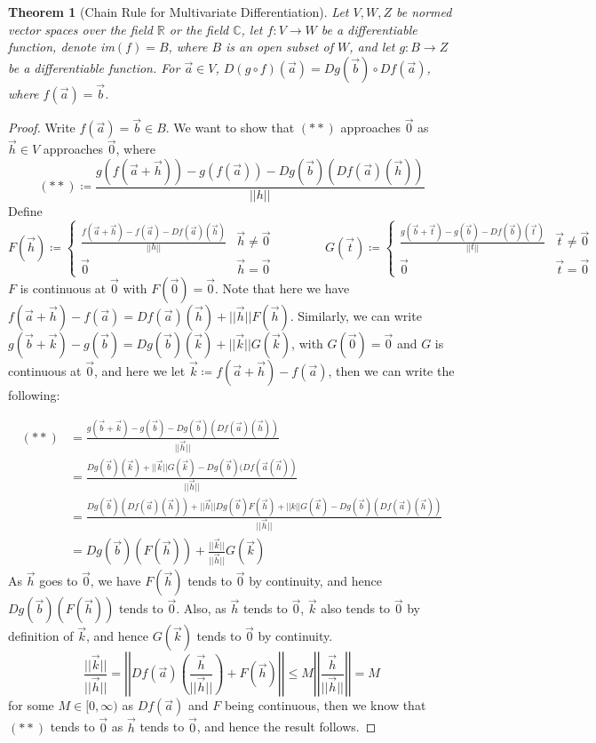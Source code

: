 \documentclass[11pt,oneside]{book}
\theoremstyle{break}
\theoremstyle{break}
\newtheorem{thm}{Theorem}[section]
\newcommand{\R}{\mathbb{R}}
\newcommand{\Complex}{\mathbb{C}}
\begin{document}
\newpage

\begin{thm}[Chain Rule for Multivariate Differentiation]
Let $V,W,Z$ be normed vector spaces over the field $\R$ or the field $\Complex$, let $f:V \to W$ be a differentiable function, denote im$(f) = B$, where $B$ is an open subset of $W$, and let $g:B \to Z$ be a differentiable function. For $\vec{a}\in V$, $D(g\circ f)(\vec{a}) = Dg(\vec{b})\circ Df(\vec{a})$, where $f(\vec{a}) = \vec{b}$.
\end{thm}
\begin{proof}
Write $f(\vec{a}) = \vec{b}\in B$. We want to show that $(**)$ approaches $\vec{0}$ as $\vec{h}\in V$ approaches $\vec{0}$, where $$(**)\coloneqq\frac{g(f(\vec{a}+\vec{h})) - g(f(\vec{a})) - Dg(\vec{b})(Df(\vec{a})(\vec{h}))}{||h||}$$ Define
$$F(\vec{h}) \coloneqq \begin{cases} \frac{f(\vec{a}+\vec{h})-f(\vec{a})-Df(\vec{a})(\vec{h})}{||h||} & \vec{h}\neq \vec{0} \\ \vec{0}& \vec{h}=\vec{0}\end{cases}\qquad \qquad G(\vec{t}) \coloneqq \begin{cases} \frac{g(\vec{b}+\vec{t})-g(\vec{b})-Df(\vec{b})(\vec{t})}{||t||} & \vec{t}\neq \vec{0} \\ \vec{0}& \vec{t}=\vec{0}\end{cases}$$
$F$ is continuous at $\vec{0}$ with $F(\vec{0}) = \vec{0}$. Note that here we have $f(\vec{a}+\vec{h}) - f(\vec{a})=Df(\vec{a})(\vec{h})+||\vec{h}||F(\vec{h})$. 
Similarly, we can write $g(\vec{b}+\vec{k})-g(\vec{b}) = Dg(\vec{b})(\vec{k})+||\vec{k}||G(\vec{k})$, with $G(\vec{0}) = \vec{0}$ and $G$ is continuous at $\vec{0}$, and here we let $\vec{k}\coloneqq f(\vec{a}+\vec{h})-f(\vec{a})$, then we can write the following:

\begin{align*}
(**) &= \frac{g(\vec{b}+\vec{k})-g(\vec{b})-Dg(\vec{b})(Df(\vec{a})(\vec{h}))}{||\vec{h}||} \\&= \frac{Dg(\vec{b})(\vec{k})+||\vec{k}||G(\vec{k})-Dg(\vec{b})(Df(\vec{a}(\vec{h}))}{||\vec{h}||}\\
&= \frac{Dg(\vec{b})(Df(\vec{a})(\vec{h}))+||\vec{h}||Dg(\vec{b})F(\vec{h})+||k||G(\vec{k})-Dg(\vec{b})(Df(\vec{a})(\vec{h}))}{||\vec{h}||}\\
&= Dg(\vec{b})(F(\vec{h}))+\frac{||\vec{k}||}{||\vec{h}||}G(\vec{k})
\end{align*}
As $\vec{h}$ goes to $\vec{0}$, we have $F(\vec{h})$ tends to $\vec{0}$ by continuity, and hence $Dg(\vec{b})(F(\vec{h}))$ tends to $\vec{0}$. Also, as $\vec{h}$ tends to $\vec{0}$, $\vec{k}$ also tends to $\vec{0}$ by definition of $\vec{k}$, and hence $G(\vec{k})$ tends to $\vec{0}$ by continuity. $$\frac{||\vec{k}||}{||\vec{h}||} = \left|\left|Df(\vec{a})\left(\frac{\vec{h}}{||\vec{h}||}\right)+F\left(\vec{h}\right)\right|\right|\leq M\left|\left|\frac{\vec{h}}{||\vec{h}||}\right|\right| = M$$ for some $M \in [0,\infty)$ as $Df(\vec{a})$ and $F$ being continuous, then we know that $(**)$ tends to $\vec{0}$ as $\vec{h}$ tends to $\vec{0}$, and hence the result follows.
\end{proof}
\end{document}
